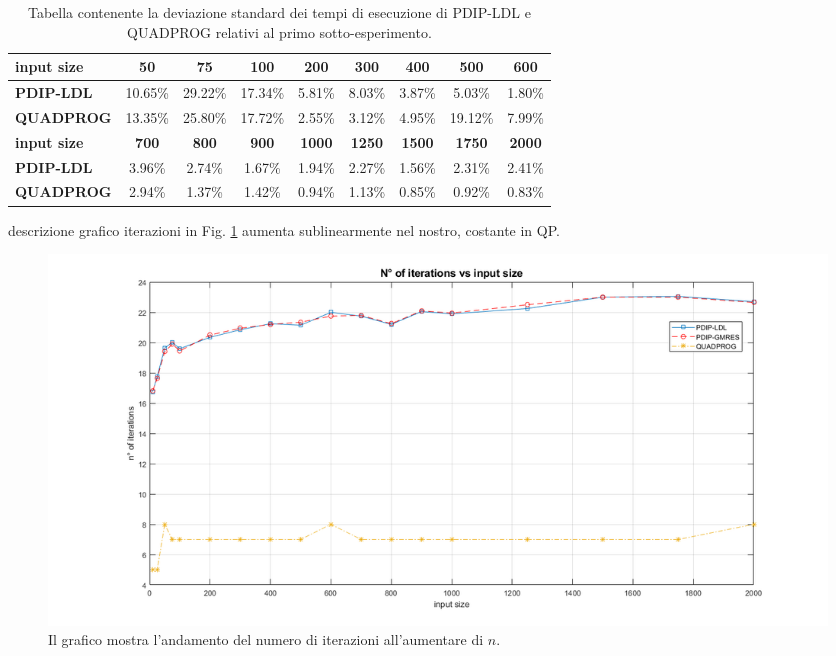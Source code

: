 \begin{table}[!h]
\centering
\begin{tabular}{|l|c|c|c|c|c|c|c|c|}\hline
\textbf{input size} & \textbf{50}  & \textbf{75}  & \textbf{100} & \textbf{200}  & \textbf{300}  & \textbf{400}  & \textbf{500}  & \textbf{600}  \\\hline
\textbf{PDIP-LDL}   & 10.65\%      & 29.22\%      & 17.34\%      & 5.81\%        & 8.03\%        & 3.87\%        & 5.03\%        & 1.80\%        \\
\textbf{QUADPROG}   & 13.35\%      & 25.80\%      & 17.72\%      & 2.55\%        & 3.12\%        & 4.95\%        & 19.12\%       & 7.99\%        \\\hline
\textbf{input size} & \textbf{700} & \textbf{800} & \textbf{900} & \textbf{1000} & \textbf{1250} & \textbf{1500} & \textbf{1750} & \textbf{2000} \\\hline
\textbf{PDIP-LDL}   & 3.96\%       & 2.74\%       & 1.67\%       & 1.94\%        & 2.27\%        & 1.56\%        & 2.31\%        & 2.41\%        \\
\textbf{QUADPROG}   & 2.94\%       & 1.37\%       & 1.42\%       & 0.94\%        & 1.13\%        & 0.85\%        & 0.92\%        & 0.83\%     \\  \hline
\end{tabular}
    \caption{Tabella contenente la deviazione standard dei tempi di esecuzione di PDIP-LDL e QUADPROG relativi al primo sotto-esperimento. \label{tab:ldlqp1.1}}
\end{table}

descrizione grafico iterazioni in Fig. \ref{fig:exp1.2} aumenta sublinearmente nel nostro, costante in QP.

\begin{figure}[!h]
    \centering
    \includegraphics[width=\textwidth]{img/MU7.png}
    \caption{Il grafico mostra l'andamento del numero di iterazioni all'aumentare di $n$. \label{fig:exp1.2}}
\end{figure}

